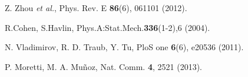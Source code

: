 \documentclass[aps, groupedaddress, superscriptaddress, prl, reprint]{revtex4-1}
\begin{document}
\begin{thebibliography}{99}
 Z. Zhou {\em et al.}, Phys. Rev. E \textbf{86}(6), 061101 (2012). 





 R.Cohen, S.Havlin, Phys.A:Stat.Mech.\textbf{336}(1-2),6 (2004).


 N. Vladimirov, R. D. Traub, Y. Tu, PloS one \textbf{6}(6), e20536 (2011). 




 P. Moretti, M. A. Mu\~noz, Nat. Comm. \textbf{4}, 2521 (2013).
\end{thebibliography}
\end{document}
